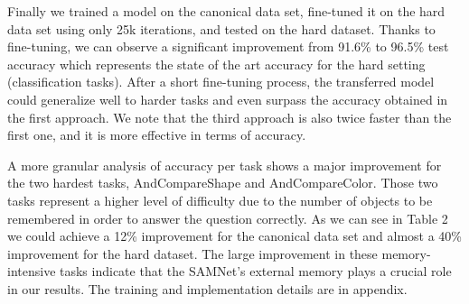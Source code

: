 Finally we trained a model on the canonical data set, fine-tuned it on the hard data set using only 25k iterations, and tested on the hard dataset. Thanks to fine-tuning, we can observe a significant improvement from 91.6\%  to 96.5\% test accuracy which represents the state of the art accuracy for the hard setting (classification tasks).
After a short fine-tuning process, the transferred model could generalize well to harder tasks and even surpass the accuracy obtained in the first approach. We note that the third approach is also twice faster than the first one, and it is more effective in terms of accuracy.

A more granular analysis of accuracy per task shows a major improvement for the two hardest tasks, AndCompareShape and AndCompareColor. Those two tasks represent a higher level of difficulty due to the number of objects to be remembered in order to answer the question correctly.
As we can see in Table 2 we could achieve a 12\% improvement for the canonical data set and almost a 40\% improvement for the hard dataset.
The large improvement in these memory-intensive tasks indicate that the SAMNet's external memory plays a crucial role in our results. 
The training and implementation details are in appendix.

